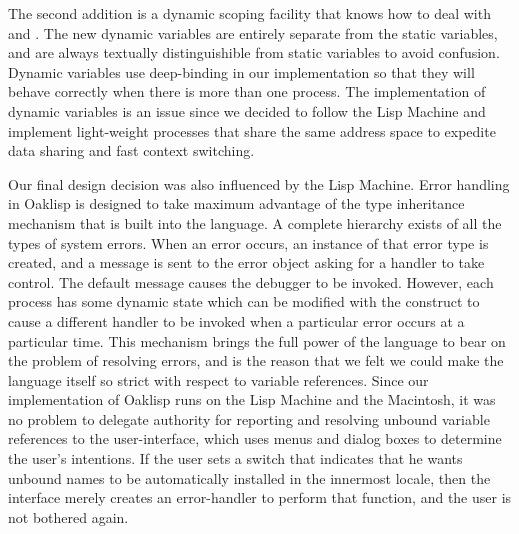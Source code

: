 The second addition is a dynamic scoping facility that knows how to
deal with  and .  The new dynamic variables are
entirely separate from the static variables, and are always textually
distinguishible from static variables to avoid confusion.  Dynamic
variables use deep-binding in our implementation so that they will
behave correctly when there is more than one process.  The
implementation of dynamic variables is an issue since we decided to
follow the Lisp Machine and implement light-weight processes that
share the same address space to expedite data sharing and fast context
switching.

Our final design decision was also influenced by the Lisp Machine.
Error handling in Oaklisp is designed to take maximum advantage of the
type inheritance mechanism that is built into the language.  A
complete hierarchy exists of all the types of system errors.  When an
error occurs, an instance of that error type is created, and a message
is sent to the error object asking for a handler to take control.  The
default message causes the debugger to be invoked.  However, each
process has some dynamic state which can be modified with the
 construct to cause a different handler to be
invoked when a particular error occurs at a particular time.  This
mechanism brings the full power of the language to bear on the problem
of resolving errors, and is the reason that we felt we could make the
language itself so strict with respect to variable references.  Since
our implementation of Oaklisp runs on the Lisp Machine and the
Macintosh, it was no problem to delegate authority for reporting and
resolving unbound variable references to the user-interface, which
uses menus and dialog boxes to determine the user's intentions.  If
the user sets a switch that indicates that he wants unbound names to
be automatically installed in the innermost locale, then the interface
merely creates an error-handler to perform that function, and the user
is not bothered again.
